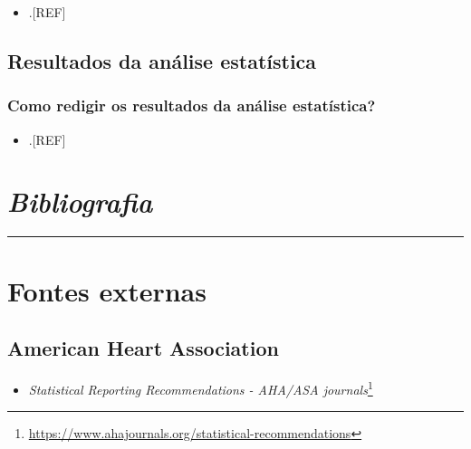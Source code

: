 \documentclass[
  a4paper,
]{book}
\providecommand{\tightlist}{%
  \setlength{\itemsep}{0pt}\setlength{\parskip}{0pt}}
\renewcommand{\href}[2]{#2\footnote{\url{#1}}}
\begin{document}
\begin{itemize}
\tightlist
\item
  .{[}REF{]}
\end{itemize}

\hypertarget{resultados-analise-estatistica}{%
\section{Resultados da análise estatística}\label{resultados-analise-estatistica}}

\hypertarget{como-redigir-os-resultados-da-anuxe1lise-estatuxedstica}{%
\subsection{Como redigir os resultados da análise estatística?}\label{como-redigir-os-resultados-da-anuxe1lise-estatuxedstica}}

\begin{itemize}
\tightlist
\item
  .{[}REF{]}
\end{itemize}


\hypertarget{bibliografia}{%
\chapter*{\texorpdfstring{\emph{Bibliografia}}{Bibliografia}}\label{bibliografia}}

\markboth{}{}
\par\noindent\rule{\textwidth}{0.05in}

\hypertarget{fontes-externas}{%
\chapter*{\texorpdfstring{\textbf{Fontes externas}}{Fontes externas}}\label{fontes-externas}}

\hypertarget{american-heart-association}{%
\section*{American Heart Association}\label{american-heart-association}}

\begin{itemize}
\tightlist
\item
  \href{https://www.ahajournals.org/statistical-recommendations}{\emph{Statistical Reporting Recommendations - AHA/ASA journals}}
\end{itemize}
\end{document}
